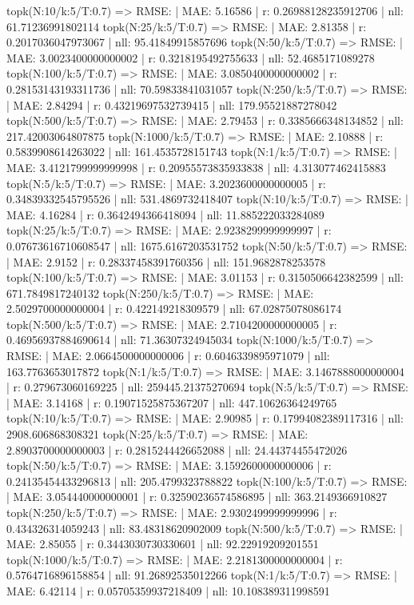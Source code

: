 topk(N:10/k:5/T:0.7) => RMSE: | MAE: 5.16586 | r: 0.26988128235912706 | nll: 61.71236991802114
topk(N:25/k:5/T:0.7) => RMSE: | MAE: 2.81358 | r: 0.2017036047973067 | nll: 95.41849915857696
topk(N:50/k:5/T:0.7) => RMSE: | MAE: 3.0023400000000002 | r: 0.3218195492755633 | nll: 52.4685171089278
topk(N:100/k:5/T:0.7) => RMSE: | MAE: 3.0850400000000002 | r: 0.28153143193311736 | nll: 70.59833841031057
topk(N:250/k:5/T:0.7) => RMSE: | MAE: 2.84294 | r: 0.43219697532739415 | nll: 179.95521887278042
topk(N:500/k:5/T:0.7) => RMSE: | MAE: 2.79453 | r: 0.3385666348134852 | nll: 217.42003064807875
topk(N:1000/k:5/T:0.7) => RMSE: | MAE: 2.10888 | r: 0.5839908614263022 | nll: 161.4535728151743
topk(N:1/k:5/T:0.7) => RMSE: | MAE: 3.4121799999999998 | r: 0.20955573835933838 | nll: 4.313077462415883
topk(N:5/k:5/T:0.7) => RMSE: | MAE: 3.2023600000000005 | r: 0.34839332545795526 | nll: 531.4869732418407
topk(N:10/k:5/T:0.7) => RMSE: | MAE: 4.16284 | r: 0.3642494366418094 | nll: 11.885222033284089
topk(N:25/k:5/T:0.7) => RMSE: | MAE: 2.9238299999999997 | r: 0.07673616710608547 | nll: 1675.6167203531752
topk(N:50/k:5/T:0.7) => RMSE: | MAE: 2.9152 | r: 0.28337458391760356 | nll: 151.9682878253578
topk(N:100/k:5/T:0.7) => RMSE: | MAE: 3.01153 | r: 0.3150506642382599 | nll: 671.7849817240132
topk(N:250/k:5/T:0.7) => RMSE: | MAE: 2.5029700000000004 | r: 0.422149218309579 | nll: 67.02875078086174
topk(N:500/k:5/T:0.7) => RMSE: | MAE: 2.7104200000000005 | r: 0.46956937884690614 | nll: 71.36307324945034
topk(N:1000/k:5/T:0.7) => RMSE: | MAE: 2.0664500000000006 | r: 0.6046339895971079 | nll: 163.7763653017872
topk(N:1/k:5/T:0.7) => RMSE: | MAE: 3.1467888000000004 | r: 0.279673060169225 | nll: 259445.21375270694
topk(N:5/k:5/T:0.7) => RMSE: | MAE: 3.14168 | r: 0.19071525875367207 | nll: 447.10626364249765
topk(N:10/k:5/T:0.7) => RMSE: | MAE: 2.90985 | r: 0.17994082389117316 | nll: 2908.606868308321
topk(N:25/k:5/T:0.7) => RMSE: | MAE: 2.8903700000000003 | r: 0.2815244426652088 | nll: 24.44374455472026
topk(N:50/k:5/T:0.7) => RMSE: | MAE: 3.1592600000000006 | r: 0.24135454433296813 | nll: 205.4799323788822
topk(N:100/k:5/T:0.7) => RMSE: | MAE: 3.054440000000001 | r: 0.32590236574586895 | nll: 363.2149366910827
topk(N:250/k:5/T:0.7) => RMSE: | MAE: 2.9302499999999996 | r: 0.434326314059243 | nll: 83.48318620902009
topk(N:500/k:5/T:0.7) => RMSE: | MAE: 2.85055 | r: 0.3443030730330601 | nll: 92.22919209201551
topk(N:1000/k:5/T:0.7) => RMSE: | MAE: 2.2181300000000004 | r: 0.5764716896158854 | nll: 91.26892535012266
topk(N:1/k:5/T:0.7) => RMSE: | MAE: 6.42114 | r: 0.05705359937218409 | nll: 10.108389311998591
